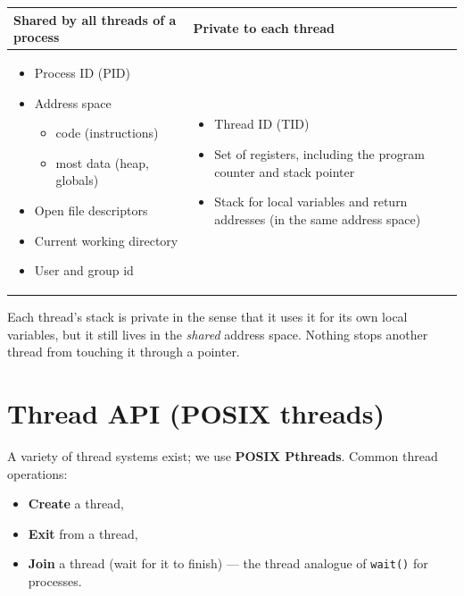 \documentclass[11pt,a4paper]{article}
\begin{document}
\begin{center}
\renewcommand{\arraystretch}{1.2}
\begin{tabularx}{\textwidth}{@{}XX@{}}
  \toprule
  \textbf{Shared by all threads of a process} & \textbf{Private to each thread} \\
  \midrule
  \begin{itemize}[leftmargin=1.1em, topsep=0pt]
    \item Process ID (PID)
    \item Address space
      \begin{itemize}[topsep=0pt]
        \item code (instructions)
        \item most data (heap, globals)
      \end{itemize}
    \item Open file descriptors
    \item Current working directory
    \item User and group id
  \end{itemize}
  &
  \begin{itemize}[leftmargin=1.1em, topsep=0pt]
    \item Thread ID (TID)
    \item Set of registers, including the program counter and stack pointer
    \item Stack for local variables and return addresses
          (in the same address space)
  \end{itemize}
  \\
  \bottomrule
\end{tabularx}
\end{center}

\begin{warnbox}
Each thread's stack is private in the sense that it uses it for its own
local variables, but it still lives in the \emph{shared} address space.
Nothing stops another thread from touching it through a pointer.
\end{warnbox}

\section{Thread API (POSIX threads)}

A variety of thread systems exist; we use \textbf{POSIX Pthreads}.
Common thread operations:
\begin{itemize}
  \item \textbf{Create} a thread,
  \item \textbf{Exit} from a thread,
  \item \textbf{Join} a thread (wait for it to finish) --- the thread
        analogue of \texttt{wait()} for processes.
\end{itemize}
\end{document}
